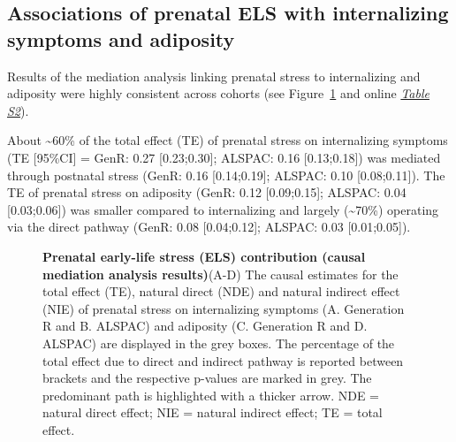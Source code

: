 \documentclass[
  letterpaper,
  DIV=11,
  numbers=noendperiod]{scrreport}
\begin{document}
\subsection{Associations of prenatal ELS with internalizing symptoms and
adiposity}\label{associations-of-prenatal-els-with-internalizing-symptoms-and-adiposity}

Results of the mediation analysis linking prenatal stress to
internalizing and adiposity were highly consistent across cohorts (see
Figure~\ref{fig-2.2} and online \href{https://osf.io/7e4x8}{\emph{Table
S2}}).

About \textasciitilde60\% of the total effect (TE) of prenatal stress on
internalizing symptoms (TE {[}95\%CI{]} = GenR: 0.27 {[}0.23;0.30{]};
ALSPAC: 0.16 {[}0.13;0.18{]}) was mediated through postnatal stress
(GenR: 0.16 {[}0.14;0.19{]}; ALSPAC: 0.10 {[}0.08;0.11{]}). The TE of
prenatal stress on adiposity (GenR: 0.12 {[}0.09;0.15{]}; ALSPAC: 0.04
{[}0.03;0.06{]}) was smaller compared to internalizing and largely
(\textasciitilde70\%) operating via the direct pathway (GenR: 0.08
{[}0.04;0.12{]}; ALSPAC: 0.03 {[}0.01;0.05{]}).

\begin{figure}[H]


\caption{\label{fig-2.2}\textbf{Prenatal early-life stress (ELS)
contribution (causal mediation analysis results)}\newline(A-D) The
causal estimates for the total effect (TE), natural direct (NDE) and
natural indirect effect (NIE) of prenatal stress on internalizing
symptoms (A. Generation R and B. ALSPAC) and adiposity (C. Generation R
and D. ALSPAC) are displayed in the grey boxes. The percentage of the
total effect due to direct and indirect pathway is reported between
brackets and the respective p-values are marked in grey. The predominant
path is highlighted with a thicker arrow. NDE = natural direct effect;
NIE = natural indirect effect; TE = total effect.}

\end{figure}%
\end{document}
